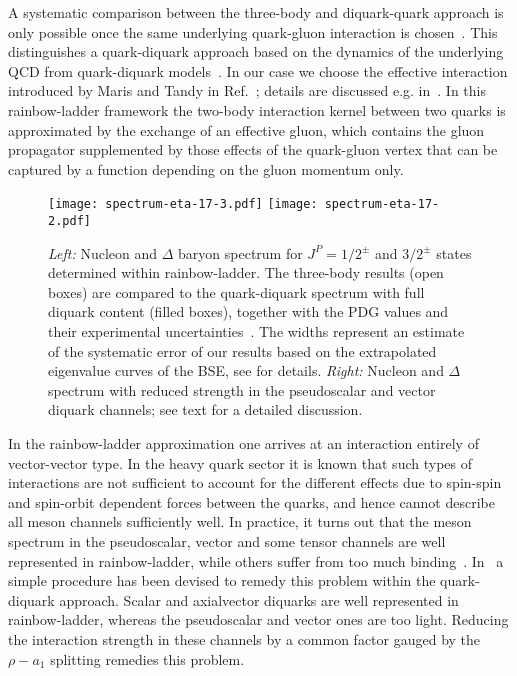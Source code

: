 \documentclass[epj,twocolumn]{webofc}
\begin{document}
A systematic comparison between the three-body and diquark-quark approach is only possible once the same
underlying quark-gluon interaction is chosen~\cite{Eichmann:2016hgl}. This distinguishes a quark-diquark approach
based on the dynamics of the underlying QCD from quark-diquark models~\cite{Oettel:1998bk,Oettel:2000jj,Segovia:2015hra}.
In our case we choose the effective interaction introduced by Maris and Tandy in Ref.~\cite{Maris:1999nt};
details are discussed e.g. in~\cite{Eichmann:2016hgl,review}. In this rainbow-ladder framework the two-body interaction
kernel between two quarks is approximated by the exchange of an effective gluon, which contains the gluon
propagator supplemented by those effects of the quark-gluon vertex that can be captured by a function depending
on the gluon momentum only.

\begin{figure*}[t]
        \centering
        \texttt{[image: spectrum-eta-17-3.pdf]}\hfill
        \texttt{[image: spectrum-eta-17-2.pdf]}
        \caption{\textit{Left:} Nucleon and $\Delta$ baryon spectrum for $J^P=1/2^\pm$ and $3/2^\pm$ states determined within rainbow-ladder.
                 The three-body results (open boxes) are compared to the quark-diquark spectrum with full diquark content (filled boxes),
                 together with the PDG values and
                 their experimental uncertainties~\cite{Agashe:2014kda}.
                 The widths represent an estimate of the systematic error of our results based on the extrapolated eigenvalue curves
                 of the BSE, see \cite{Eichmann:2016hgl} for details.
                \textit{Right:} Nucleon and $\Delta$ spectrum with reduced strength in the
                                pseudoscalar and vector diquark channels; see text for a detailed discussion.} \label{spectrum}
\end{figure*}

In the rainbow-ladder approximation one arrives at an interaction entirely of vector-vector type. In the heavy quark sector
it is known that such types of interactions are not sufficient to account for the different effects due to spin-spin
and spin-orbit dependent forces between the quarks, and hence cannot describe all meson channels sufficiently well.
In practice, it turns out that the meson spectrum in the pseudoscalar, vector and some tensor channels are well
represented in rainbow-ladder, while others suffer from too much binding~\cite{Hilger:2014nma,Fischer:2014cfa}.
In~\cite{Roberts:2011cf,Eichmann:2016hgl} a simple procedure has been devised to remedy this problem within the quark-diquark approach.
Scalar and axialvector diquarks are well represented in rainbow-ladder, whereas the pseudoscalar and vector
ones are too light. Reducing the interaction strength in these channels by a common factor gauged by the
$\rho-a_1$ splitting remedies this problem.
\end{document}
